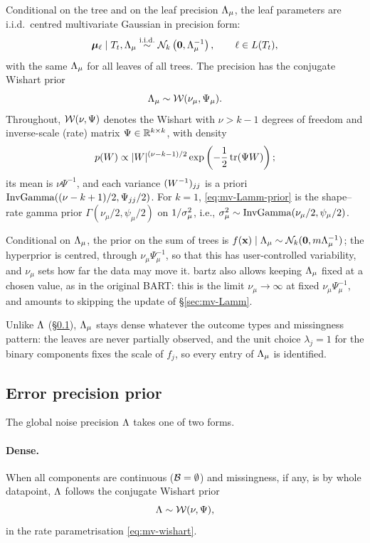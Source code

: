 Conditional on the tree and on the leaf precision $\Lambda_{\mu}$, the leaf
parameters are i.i.d.\ centred multivariate Gaussian in precision form:
\begin{equation}
	\label{eq:mv-leaf-prior}
	\bm{\mu}_\ell \mid T_t, \Lambda_{\mu} \stackrel{\text{i.i.d.}}{\sim}
	\mathcal{N}_k\left(\mathbf{0}, \Lambda_{\mu}^{-1}\right),
	\qquad \ell \in L(T_t),
\end{equation}
with the same $\Lambda_{\mu}$ for all leaves of all trees. The precision has the
conjugate Wishart prior
\begin{equation}
	\label{eq:mv-Lamm-prior}
	\Lambda_{\mu} \sim \mathcal{W}(\nu_\mu, \Psi_\mu).
\end{equation}
Throughout, $\mathcal{W}(\nu, \Psi)$ denotes the Wishart with $\nu > k - 1$ degrees
of freedom and inverse-scale (rate) matrix $\Psi \in \mathbb{R}^{k \times k}$, with
density
\begin{equation}
	\label{eq:mv-wishart}
	p(W) \propto |W|^{(\nu - k - 1)/2}
	\exp\left(-\frac{1}{2}\operatorname{tr}(\Psi W)\right);
\end{equation}
its mean is $\nu \Psi^{-1}$, and each variance $(W^{-1})_{jj}$ is a priori
$\mathrm{InvGamma}((\nu - k + 1)/2, \Psi_{jj}/2)$. For $k = 1$, \eqref{eq:mv-Lamm-prior} is the shape--rate
gamma prior $\Gamma(\nu_\mu/2, \psi_\mu/2)$ on $1/\sigma_\mu^{2}$, i.e.,
$\sigma_\mu^{2} \sim \mathrm{InvGamma}(\nu_\mu/2, \psi_\mu/2)$.

Conditional on $\Lambda_{\mu}$, the prior on the sum of trees is
$f(\mathbf{x}) \mid \Lambda_{\mu} \sim \mathcal{N}_k(\mathbf{0}, m \Lambda_{\mu}^{-1})$; the hyperprior is
centred, through $\nu_\mu \Psi_\mu^{-1}$, so that this has user-controlled
variability, and $\nu_\mu$ sets how far the data may move it. bartz also
allows keeping $\Lambda_{\mu}$ fixed at a chosen value, as in the original BART:
this is the limit $\nu_\mu \to \infty$ at fixed $\nu_\mu \Psi_\mu^{-1}$, and
amounts to skipping the update of \S\ref{sec:mv-Lamm}.

Unlike $\Lambda$ (\S\ref{sec:mv-Lam-prior}), $\Lambda_{\mu}$ stays dense whatever the
outcome types and missingness pattern: the leaves are never partially
observed, and the unit choice $\lambda_j = 1$ for the binary components fixes
the scale of $f_j$, so every entry of $\Lambda_{\mu}$ is identified.

\subsection{Error precision prior}
\label{sec:mv-Lam-prior}

The global noise precision $\Lambda$ takes one of two forms.

\paragraph{Dense.}
When all components are continuous ($\mathcal{B} = \emptyset$) and missingness, if
any, is by whole datapoint, $\Lambda$ follows the conjugate Wishart prior
\begin{equation}
	\label{eq:mv-iw-prior}
	\Lambda \sim \mathcal{W}(\nu, \Psi),
\end{equation}
in the rate parametrisation \eqref{eq:mv-wishart}.


